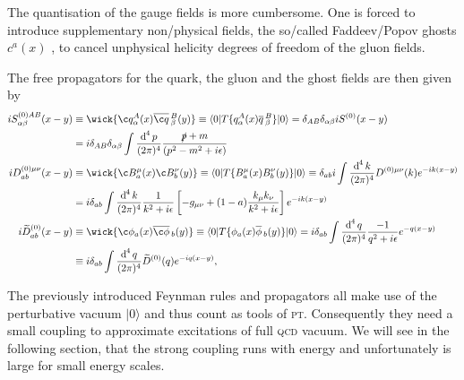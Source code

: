 \documentclass[../../index.tex]{subfiles}
\begin{document}
The quantisation of the gauge fields is more cumbersome. One is forced to
introduce supplementary non\-/physical fields, the so\-/called Faddeev\-/Popov
ghosts \(c^a(x)\) \cite{Faddeev1967}, to cancel unphysical helicity degrees of
freedom of the gluon fields.

The free propagators for the quark, the gluon and the ghost fields are then
given by
\begin{equation}
  \begin{split}
    i S^{(0)AB}_{\alpha\beta}(x-y) &\equiv \wick{ \c q_\alpha^A(x) \anti{\c
        q}_\beta^B(y)} \equiv \langle 0 \vert T \{ q_\alpha^A(x)
    \anti{q}_\beta^B \} \vert 0 \rangle
    = \delta_{AB} \delta_{\alpha\beta} i S^{(0)}(x-y) \\
    &= i \delta_{AB}\delta_{\alpha\beta}\int \fdif{p} \frac{\slashed p + m}{(p^2 - m^2 + i\epsilon)}\\
    i D^{(0)\mu\nu}_{ab}(x-y) &\equiv \wick{ \c B_a^\mu(x) \c B_b^\nu(y)} \equiv
    \langle 0 \vert T \{ B_a^\mu(x) B_b^\nu(y) \} \vert 0 \rangle
    \equiv \delta_{ab}i \int \fdif{k} D^{(0)\mu\nu}(k) e^{-ik(x-y)} \\
    &= i \delta_{ab} \int \fdif{k} \frac{1}{k^2+i\epsilon} \left[ -g_{\mu\nu} + (1-a) \frac{k_\mu k_\nu}{k^2+i\epsilon} \right] e^{-ik(x-y)} \\
    i \widetilde{D}_{ab}^{(0)}(x-y) & \equiv \wick{\c \phi_a(x) \anti{\c
        \phi}_b(y)} \equiv \langle 0 \vert T\{ \phi_a(x) \anti{\phi}_b(y) \}
    \vert 0 \rangle
    = i \delta_{ab} \int \fdif{q} \frac{-1}{q^2 + i\epsilon} e^{-q(x-y)} \\
    &\equiv i \delta_{ab} \int \fdif{q} \widetilde{D}^{(0)}(q) e^{-iq(x-y)},
  \end{split}
\end{equation}

The previously introduced Feynman rules and propagators all make use of the
perturbative vacuum \(\vert 0 \rangle\) and thus count as tools of \textsc{pt}.
Consequently they need a small coupling to approximate excitations of full
\textsc{qcd} vacuum. We will see in the following section, that the strong
coupling runs with energy and unfortunately is large for small energy scales.
\end{document}
